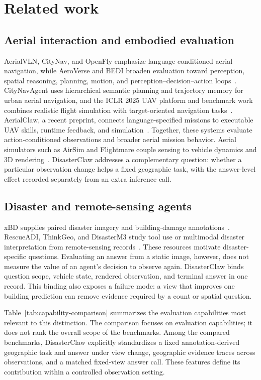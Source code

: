 \section{Related work}
\subsection{Aerial interaction and embodied evaluation}
AerialVLN, CityNav, and OpenFly emphasize language-conditioned aerial navigation, while AeroVerse and BEDI broaden evaluation toward perception, spatial reasoning, planning, motion, and perception--decision--action loops~\cite{liu2023aerialvln,lee2025citynav,gao2026openfly,yao2024aeroverse,guo2026bedi}. CityNavAgent uses hierarchical semantic planning and trajectory memory for urban aerial navigation, and the ICLR 2025 UAV platform and benchmark work combines realistic flight simulation with target-oriented navigation tasks~\cite{zhang2025citynavagent,wang2025openuav}. AerialClaw, a recent preprint, connects language-specified missions to executable UAV skills, runtime feedback, and simulation~\cite{li2026aerialclaw}. Together, these systems evaluate action-conditioned observations and broader aerial mission behavior. Aerial simulators such as AirSim and Flightmare couple sensing to vehicle dynamics and 3D rendering~\cite{shah2018airsim,song2021flightmare}. DisasterClaw addresses a complementary question: whether a particular observation change helps a fixed geographic task, with the answer-level effect recorded separately from an extra inference call.

\subsection{Disaster and remote-sensing agents}
xBD supplies paired disaster imagery and building-damage annotations~\cite{gupta2019xbd}. RescueADI, ThinkGeo, and DisasterM3 study tool use or multimodal disaster interpretation from remote-sensing records~\cite{liu2024rescueadi,thinkgeo2025,wang2025disasterm3}. These resources motivate disaster-specific questions. Evaluating an answer from a static image, however, does not measure the value of an agent's decision to observe again. DisasterClaw binds question scope, vehicle state, rendered observation, and terminal answer in one record. This binding also exposes a failure mode: a view that improves one building prediction can remove evidence required by a count or spatial question.

Table~\ref{tab:capability-comparison} summarizes the evaluation capabilities most relevant to this distinction. The comparison focuses on evaluation capabilities; it does not rank the overall scope of the benchmarks. Among the compared benchmarks, DisasterClaw explicitly standardizes a fixed annotation-derived geographic task and answer under view change, geographic evidence traces across observations, and a matched fixed-view answer call. These features define its contribution within a controlled observation setting.

